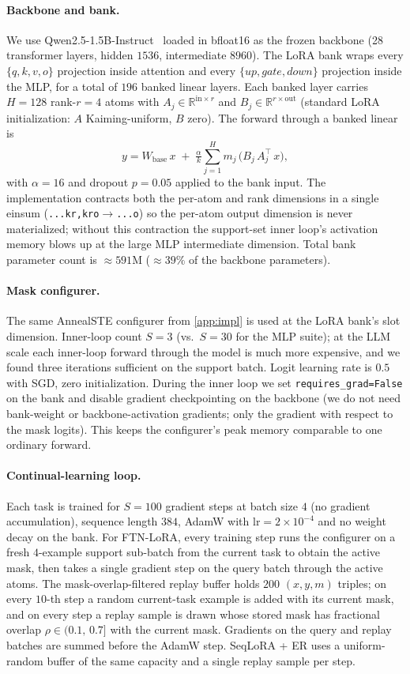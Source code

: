 \documentclass[11pt]{article}
\begin{document}
\paragraph{Backbone and bank.}
We use Qwen2.5-1.5B-Instruct~\citep{qwen2_5_2024} loaded in bfloat16 as the frozen backbone (28 transformer layers, hidden $1536$, intermediate $8960$). The LoRA bank wraps every $\{q,k,v,o\}$ projection inside attention and every $\{up, gate, down\}$ projection inside the MLP, for a total of $196$ banked linear layers. Each banked layer carries $H=128$ rank-$r=4$ atoms with $A_j\in\mathbb{R}^{\mathrm{in}\times r}$ and $B_j\in\mathbb{R}^{r\times\mathrm{out}}$ (standard LoRA initialization: $A$ Kaiming-uniform, $B$ zero). The forward through a banked linear is
\[
y = W_\mathrm{base}\,x \;+\; \tfrac{\alpha}{k}\sum_{j=1}^{H} m_j\,\bigl(B_j\,A_j^\top\,x\bigr),
\]
with $\alpha=16$ and dropout $p=0.05$ applied to the bank input. The implementation contracts both the per-atom and rank dimensions in a single einsum (\texttt{...kr,kro$\rightarrow$...o}) so the per-atom output dimension is never materialized; without this contraction the support-set inner loop's activation memory blows up at the large MLP intermediate dimension. Total bank parameter count is $\approx\!591$M ($\approx\!39\%$ of the backbone parameters).

\paragraph{Mask configurer.}
The same AnnealSTE configurer from \cref{app:impl} is used at the LoRA bank's slot dimension. Inner-loop count $S=3$ (vs.\ $S=30$ for the MLP suite); at the LLM scale each inner-loop forward through the model is much more expensive, and we found three iterations sufficient on the support batch. Logit learning rate is $0.5$ with SGD, zero initialization. During the inner loop we set \texttt{requires\_grad=False} on the bank and disable gradient checkpointing on the backbone (we do not need bank-weight or backbone-activation gradients; only the gradient with respect to the mask logits). This keeps the configurer's peak memory comparable to one ordinary forward.

\paragraph{Continual-learning loop.}
Each task is trained for $S{=}100$ gradient steps at batch size $4$ (no gradient accumulation), sequence length $384$, AdamW with $\mathrm{lr}=2{\times}10^{-4}$ and no weight decay on the bank. For FTN-LoRA, every training step runs the configurer on a fresh $4$-example support sub-batch from the current task to obtain the active mask, then takes a single gradient step on the query batch through the active atoms. The mask-overlap-filtered replay buffer holds $200$ $(x,y,m)$ triples; on every $10$-th step a random current-task example is added with its current mask, and on every step a replay sample is drawn whose stored mask has fractional overlap $\rho\in(0.1,\,0.7]$ with the current mask. Gradients on the query and replay batches are summed before the AdamW step. SeqLoRA + ER uses a uniform-random buffer of the same capacity and a single replay sample per step.
\end{document}
